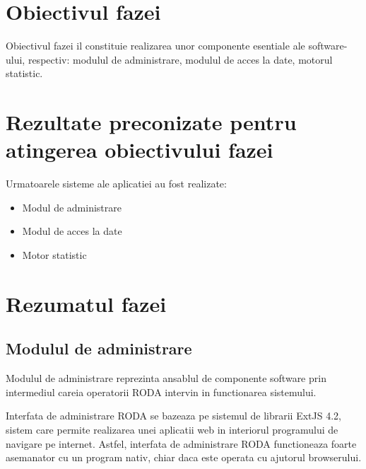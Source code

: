 \documentclass[a4paper, 10pt]{article}
\begin{document}
{\section{Obiectivul fazei}


Obiectivul fazei il constituie realizarea unor componente esentiale ale software-ului, respectiv:
modulul de administrare, modulul de acces la date, motorul statistic.



\section{Rezultate preconizate pentru atingerea obiectivului fazei}

Urmatoarele sisteme ale aplicatiei au fost realizate:
\begin{itemize}
\item
Modul de administrare
\item
Modul de acces la date
\item
Motor statistic
\end{itemize}

\section{Rezumatul fazei}

\medskip

\subsection{Modulul de administrare}

Modulul de administrare reprezinta ansablul de componente software
prin intermediul careia operatorii RODA intervin in functionarea sistemului.

Interfata de administrare RODA se bazeaza pe sistemul de librarii
ExtJS 4.2, sistem care permite realizarea unei aplicatii web in interiorul
programului de navigare pe internet. Astfel, interfata de administrare
RODA functioneaza foarte asemanator cu un program nativ, chiar daca
este operata cu ajutorul browserului. 

}
\end{document}
